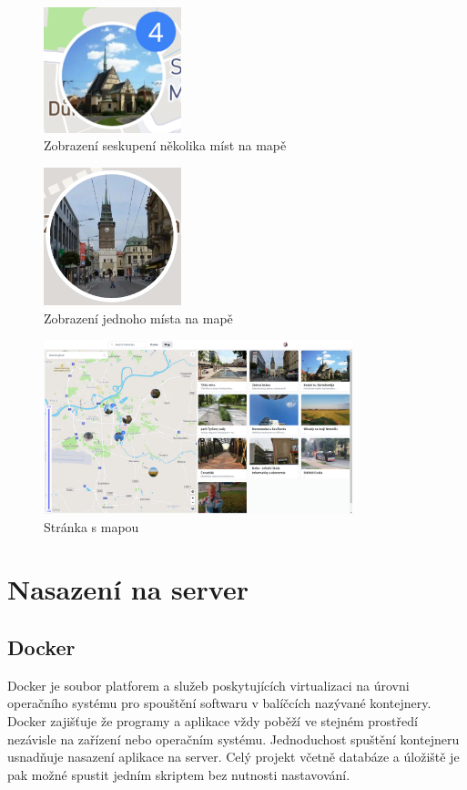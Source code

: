 \documentclass[12pt, a4paper,
 twoside,        %
 openright
]{report}
\begin{document}
\begin{figure}[h]
	\centering
	\includegraphics[width=4cm]{images/places_cluster.png}
	\caption{Zobrazení seskupení několika míst na mapě}
\end{figure}
\begin{figure}[h]
	\centering
	\includegraphics[width=4cm]{images/place.png}
	\caption{Zobrazení jednoho místa na mapě}
\end{figure}

\begin{figure}[h]
	\centering
	\includegraphics[width=0.8\textwidth]{images/map_page.png}
	\caption{Stránka s mapou}
\end{figure}

\chapter{Nasazení na server}
\section{Docker}
Docker je soubor platforem a služeb poskytujících virtualizaci na úrovni operačního systému pro spouštění softwaru v balíčcích nazývané kontejnery. Docker zajišťuje že programy a aplikace vždy poběží ve stejném prostředí nezávisle na zařízení nebo operačním systému. Jednoduchost spuštění kontejneru usnadňuje nasazení aplikace na server. Celý projekt včetně databáze a úložiště je pak možné spustit jedním skriptem bez nutnosti nastavování.
\end{document}
